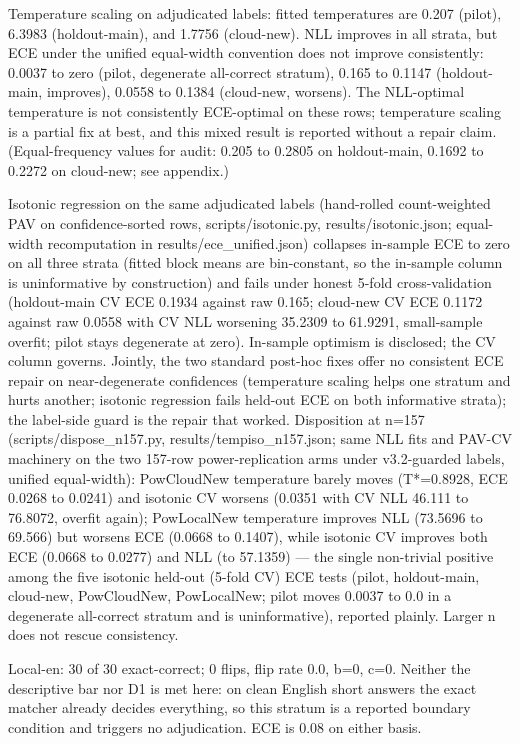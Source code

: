 \documentclass[10pt]{article} %
\begin{document}
Temperature scaling on adjudicated labels: fitted temperatures are 0.207 (pilot), 6.3983 (holdout-main), and 1.7756 (cloud-new). NLL improves in all strata, but ECE under the unified equal-width convention does not improve consistently: 0.0037 to zero (pilot, degenerate all-correct stratum), 0.165 to 0.1147 (holdout-main, improves), 0.0558 to 0.1384 (cloud-new, worsens). The NLL-optimal temperature is not consistently ECE-optimal on these rows; temperature scaling is a partial fix at best, and this mixed result is reported without a repair claim. (Equal-frequency values for audit: 0.205 to 0.2805 on holdout-main, 0.1692 to 0.2272 on cloud-new; see appendix.)

Isotonic regression on the same adjudicated labels (hand-rolled count-weighted PAV on confidence-sorted rows, scripts/isotonic.py, results/isotonic.json; equal-width recomputation in results/ece\_unified.json) collapses in-sample ECE to zero on all three strata (fitted block means are bin-constant, so the in-sample column is uninformative by construction) and fails under honest 5-fold cross-validation (holdout-main CV ECE 0.1934 against raw 0.165; cloud-new CV ECE 0.1172 against raw 0.0558 with CV NLL worsening 35.2309 to 61.9291, small-sample overfit; pilot stays degenerate at zero). In-sample optimism is disclosed; the CV column governs. Jointly, the two standard post-hoc fixes offer no consistent ECE repair on near-degenerate confidences (temperature scaling helps one stratum and hurts another; isotonic regression fails held-out ECE on both informative strata); the label-side guard is the repair that worked. Disposition at n=157 (scripts/dispose\_n157.py, results/tempiso\_n157.json; same NLL fits and PAV-CV machinery on the two 157-row power-replication arms under v3.2-guarded labels, unified equal-width): PowCloudNew temperature barely moves (T*=0.8928, ECE 0.0268 to 0.0241) and isotonic CV worsens (0.0351 with CV NLL 46.111 to 76.8072, overfit again); PowLocalNew temperature improves NLL (73.5696 to 69.566) but worsens ECE (0.0668 to 0.1407), while isotonic CV improves both ECE (0.0668 to 0.0277) and NLL (to 57.1359) — the single non-trivial positive among the five isotonic held-out (5-fold CV) ECE tests (pilot, holdout-main, cloud-new, PowCloudNew, PowLocalNew; pilot moves 0.0037 to 0.0 in a degenerate all-correct stratum and is uninformative), reported plainly. Larger n does not rescue consistency.

Local-en: 30 of 30 exact-correct; 0 flips, flip rate 0.0, b=0, c=0. Neither the descriptive bar nor D1 is met here: on clean English short answers the exact matcher already decides everything, so this stratum is a reported boundary condition and triggers no adjudication. ECE is 0.08 on either basis.
\end{document}
